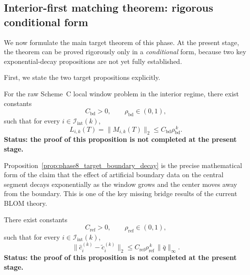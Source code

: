 \subsection{Interior-first matching theorem: rigorous conditional form}
\label{subsec:phase8_conditional_matching}

We now formulate the main target theorem of this phase.
At the present stage, the theorem can be proved rigorously only in a \emph{conditional} form, because two key exponential-decay propositions are not yet fully established.

First, we state the two target propositions explicitly.

\begin{proposition}
\label{prop:phase8_target_boundary_decay}
For the raw Scheme~C local window problem in the interior regime, there exist constants
\[
C_{\mathrm{bd}}>0,\qquad \rho_{\mathrm{bd}}\in(0,1),
\]
such that for every \(i\in\mathcal I_{\mathrm{int}}(k)\),
\begin{equation}
\label{eq:phase8_target_boundary_decay}
L_{i,k}(T)
=
\|M_{i,k}(T)\|_2
\le
C_{\mathrm{bd}}\rho_{\mathrm{bd}}^{\,k}.
\end{equation}
\textbf{Status: the proof of this proposition is not completed at the present stage.}
\end{proposition}

\begin{remark}
\label{rem:phase8_target_boundary_decay_meaning}
Proposition~\ref{prop:phase8_target_boundary_decay} is the precise mathematical form of the claim that the effect of artificial boundary data on the central segment decays exponentially as the window grows and the center moves away from the boundary.
This is one of the key missing bridge results of the current BLOM theory.
\end{remark}

\begin{proposition}
\label{prop:phase8_target_ref_vs_ideal}
There exist constants
\[
C_{\mathrm{ref}}>0,\qquad \rho_{\mathrm{ref}}\in(0,1),
\]
such that for every \(i\in\mathcal I_{\mathrm{int}}(k)\),
\begin{equation}
\label{eq:phase8_target_ref_vs_ideal}
\|\hat c_i^{(k)}-\tilde c_i^{(k)}\|_2
\le
C_{\mathrm{ref}}\rho_{\mathrm{ref}}^{\,k}\,\|\bar q\|_\infty.
\end{equation}
\textbf{Status: the proof of this proposition is not completed at the present stage.}
\end{proposition}

